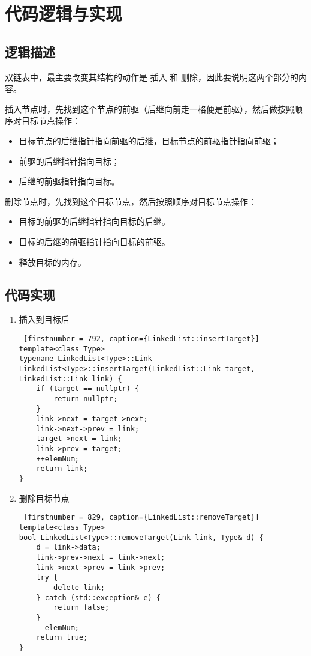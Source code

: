 \section{代码逻辑与实现}

\subsection{逻辑描述}


双链表中，最主要改变其结构的动作是 {\kaishu 插入} 和 {\kaishu 删除}，因此要说明这两个部分的内容。

插入节点时，先找到这个节点的前驱（后继向前走一格便是前驱），然后做按照顺序对目标节点操作：

\begin{itemize}
    \item 目标节点的后继指针指向前驱的后继，目标节点的前驱指针指向前驱；
    \item 前驱的后继指针指向目标；
    \item 后继的前驱指针指向目标。
\end{itemize}

删除节点时，先找到这个目标节点，然后按照顺序对目标节点操作：
\begin{itemize}
    \item 目标的前驱的后继指针指向目标的后继。
    \item 目标的后继的前驱指针指向目标的前驱。
    \item 释放目标的内存。
\end{itemize}


\subsection{代码实现}

{
\begin{enumerate}
      \item 插入到目标后
\begin{lstlisting} [firstnumber = 792, caption={LinkedList::insertTarget}]
template<class Type>
typename LinkedList<Type>::Link
LinkedList<Type>::insertTarget(LinkedList::Link target, LinkedList::Link link) {
    if (target == nullptr) {
        return nullptr;
    }
    link->next = target->next;
    link->next->prev = link;
    target->next = link;
    link->prev = target;
    ++elemNum;
    return link;
} \end{lstlisting}
      \item 删除目标节点
\begin{lstlisting} [firstnumber = 829, caption={LinkedList::removeTarget}]
template<class Type>
bool LinkedList<Type>::removeTarget(Link link, Type& d) {
    d = link->data;
    link->prev->next = link->next;
    link->next->prev = link->prev;
    try {
        delete link;
    } catch (std::exception& e) {
        return false;
    }
    --elemNum;
    return true;
}\end{lstlisting}
      
\end{enumerate}
}

